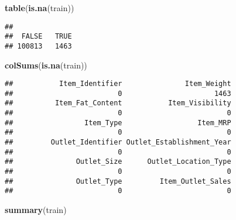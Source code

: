 \documentclass[]{article}
\newenvironment{Shaded}{\begin{snugshade}}{\end{snugshade}}
\newcommand{\KeywordTok}[1]{\textcolor[rgb]{0.13,0.29,0.53}{\textbf{#1}}}
\newcommand{\NormalTok}[1]{#1}
\begin{document}
\begin{Shaded}
\begin{Highlighting}[]
\KeywordTok{table}\NormalTok{(}\KeywordTok{is.na}\NormalTok{(train))}
\end{Highlighting}
\end{Shaded}

\begin{verbatim}
## 
##  FALSE   TRUE 
## 100813   1463
\end{verbatim}

\begin{Shaded}
\begin{Highlighting}[]
\KeywordTok{colSums}\NormalTok{(}\KeywordTok{is.na}\NormalTok{(train))}
\end{Highlighting}
\end{Shaded}

\begin{verbatim}
##           Item_Identifier               Item_Weight 
##                         0                      1463 
##          Item_Fat_Content           Item_Visibility 
##                         0                         0 
##                 Item_Type                  Item_MRP 
##                         0                         0 
##         Outlet_Identifier Outlet_Establishment_Year 
##                         0                         0 
##               Outlet_Size      Outlet_Location_Type 
##                         0                         0 
##               Outlet_Type         Item_Outlet_Sales 
##                         0                         0
\end{verbatim}

\begin{Shaded}
\begin{Highlighting}[]
\KeywordTok{summary}\NormalTok{(train)}
\end{Highlighting}
\end{Shaded}
\end{document}
